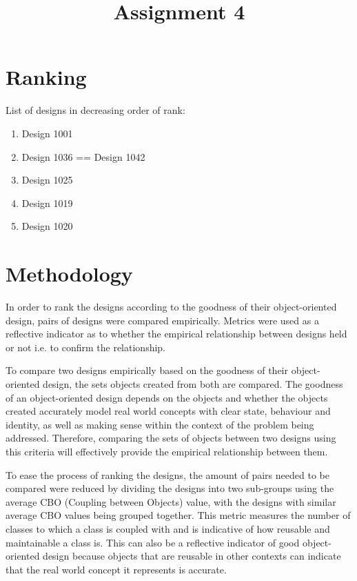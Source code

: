 \documentclass[conference]{IEEEtran}
\begin{document}
\title{Assignment 4}

\author{
}

\maketitle

\section{Ranking}
List of designs in decreasing order of rank:
\begin{enumerate}
	\item Design 1001
	\item Design 1036 == Design 1042
	\item Design 1025
	\item Design 1019
	\item Design 1020
\end{enumerate}

\section{Methodology}
In order to rank the designs according to the goodness of their object-oriented design, pairs of designs were compared empirically. Metrics were used as a reflective indicator as to whether the empirical relationship between designs held or not i.e. to confirm the relationship. 

To compare two designs empirically based on the goodness of their object-oriented design, the sets objects created from both are compared. The goodness of an object-oriented design depends on the objects and whether the objects created accurately model real world concepts with clear state, behaviour and identity, as well as making sense within the context of the problem being addressed. Therefore, comparing the sets of objects between two designs using this criteria will effectively provide the empirical relationship between them.

To ease the process of ranking the designs, the amount of pairs needed to be compared were reduced by dividing the designs into two sub-groups using the average CBO (Coupling between Objects) value, with the designs with similar average CBO values being grouped together. This metric measures the number of classes to which a class is coupled with and is indicative of how reusable and maintainable a class is. This can also be a reflective indicator of good object-oriented design because objects that are reusable in other contexts can indicate that the real world concept it represents is accurate. 
\end{document}

